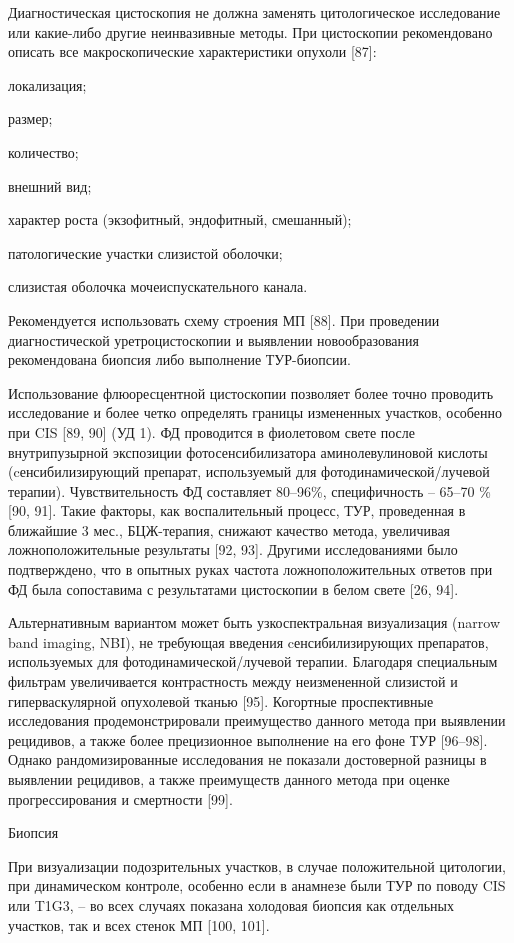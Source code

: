 Диагностическая цистоскопия не должна заменять цитологическое исследование или какие-либо другие неинвазивные методы. При цистоскопии рекомендовано описать все макроскопические характеристики опухоли [87]:

локализация;

размер;

количество;

внешний вид;

характер роста (экзофитный, эндофитный, смешанный);

патологические участки слизистой оболочки;

слизистая оболочка мочеиспускательного канала.

Рекомендуется использовать схему строения МП [88]. При проведении диагностической уретроцистоскопии и выявлении новообразования рекомендована биопсия либо выполнение ТУР-биопсии.

Использование флюоресцентной цистоскопии позволяет более точно проводить исследование и более четко определять границы измененных участков, особенно при CIS [89, 90] (УД 1). ФД проводится в фиолетовом свете после внутрипузырной экспозиции фотосенсибилизатора аминолевулиновой кислоты (cенсибилизирующий препарат, используемый для фотодинамической/лучевой терапии). Чувствительность ФД составляет 80–96\%, специфичность – 65–70 \% [90, 91]. Такие факторы, как воспалительный процесс, ТУР, проведенная в ближайшие 3 мес., БЦЖ-терапия, снижают качество метода, увеличивая ложноположительные результаты [92, 93]. Другими исследованиями было подтверждено, что в опытных руках частота ложноположительных ответов при ФД была сопоставима с результатами цистоскопии в белом свете [26, 94].

Альтернативным вариантом может быть узкоспектральная визуализация (narrow band imaging, NBI), не требующая введения cенсибилизирующих препаратов, используемых для фотодинамической/лучевой терапии. Благодаря специальным фильтрам увеличивается контрастность между неизмененной слизистой и гиперваскулярной опухолевой тканью [95]. Когортные проспективные исследования продемонстрировали преимущество данного метода при выявлении рецидивов, а также более прецизионное выполнение на его фоне ТУР [96–98]. Однако рандомизированные исследования не показали достоверной разницы в выявлении рецидивов, а также преимуществ данного метода при оценке прогрессирования и смертности [99].

Биопсия

При визуализации подозрительных участков, в случае положительной цитологии, при динамическом контроле, особенно если в анамнезе были ТУР по поводу CIS или T1G3, – во всех случаях показана холодовая биопсия как отдельных участков, так и всех стенок МП [100, 101].

